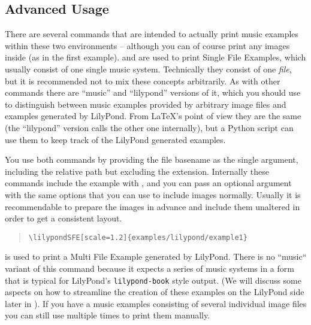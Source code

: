 \documentclass[../openLilyLib]{subfiles}
\begin{document}
\subsection{Advanced Usage}
\label{subsec:xmp_advanced-usage}

There are several commands that are intended to actually print music examples within these two environments -- although you can of course print any images inside (as in the first example).
 and  are used to print Single File Examples, which usually consist of one single music system.
Technically they consist of one \emph{file}, but it is recommended not to mix these concepts arbitrarily.
As with other commands there are “music” and “lilypond” versions of it, which  you should use to distinguish between music examples provided by arbitrary image files and examples generated by LilyPond.
From \LaTeX's point of view they are the same (the “lilypond” version calls the other one internally), but a Python script can use them to keep track of the LilyPond generated examples.

You use both commands by providing the file basename as the single argument, including the relative path but excluding the extension.
Internally these commands include the example with , and you can pass an optional argument with the same options that you can use to include images normally.
Usually it is recommendable to prepare the images in advance and include them unaltered in order to get a consistent layout.


\begin{quote}
\begin{verbatim}
\lilypondSFE[scale=1.2]{examples/lilypond/example1}
\end{verbatim}
\end{quote}

 is used to print a Multi File Example generated by LilyPond.
There is no “music“ variant of this command because it expects a series of music systems in a form that is typical for LilyPond's \texttt{lilypond-book} style output.
(We will discuss some aspects on how to streamline the creation of these examples on the LilyPond side later in ).
If you have a music examples consisting of several individual image files you can still use  multiple times to print them manually.
\end{document}
